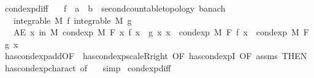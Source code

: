 \begin{isabellebody}
%
\endisatagproof
{\isafoldproof}%
%
\isadelimproof
\isanewline
%
\endisadelimproof
\isanewline
{}\isamarkupfalse%
\ cond{\isacharunderscore}{\kern0pt}exp{\isacharunderscore}{\kern0pt}diff{\isacharcolon}{\kern0pt}\isanewline
\ \ \ f\ {\isacharcolon}{\kern0pt}{\isacharcolon}{\kern0pt}\ {\isachardoublequoteopen}{\isacharprime}{\kern0pt}a\ {\isasymRightarrow}\ {\isacharprime}{\kern0pt}b\ {\isacharcolon}{\kern0pt}{\isacharcolon}{\kern0pt}\ {\isacharbraceleft}{\kern0pt}second{\isacharunderscore}{\kern0pt}countable{\isacharunderscore}{\kern0pt}topology{\isacharcomma}{\kern0pt}\ banach{\isacharbraceright}{\kern0pt}{\isachardoublequoteclose}\isanewline
\ \ \ {\isachardoublequoteopen}integrable\ M\ f{\isachardoublequoteclose}\ {\isachardoublequoteopen}integrable\ M\ g{\isachardoublequoteclose}\isanewline
\ \ \ {\isachardoublequoteopen}AE\ x\ in\ M{\isachardot}{\kern0pt}\ cond{\isacharunderscore}{\kern0pt}exp\ M\ F\ {\isacharparenleft}{\kern0pt}{\isasymlambda}x{\isachardot}{\kern0pt}\ f\ x\ {\isacharminus}{\kern0pt}\ g\ x{\isacharparenright}{\kern0pt}\ x\ {\isacharequal}{\kern0pt}\ cond{\isacharunderscore}{\kern0pt}exp\ M\ F\ f\ x\ {\isacharminus}{\kern0pt}\ cond{\isacharunderscore}{\kern0pt}exp\ M\ F\ g\ x{\isachardoublequoteclose}\isanewline
%
\isadelimproof
\ \ %
\endisadelimproof
%
\isatagproof
{}\isamarkupfalse%
\ has{\isacharunderscore}{\kern0pt}cond{\isacharunderscore}{\kern0pt}exp{\isacharunderscore}{\kern0pt}add{\isacharbrackleft}{\kern0pt}OF\ {\isacharunderscore}{\kern0pt}\ has{\isacharunderscore}{\kern0pt}cond{\isacharunderscore}{\kern0pt}exp{\isacharunderscore}{\kern0pt}scaleR{\isacharunderscore}{\kern0pt}right{\isacharcomma}{\kern0pt}\ OF\ has{\isacharunderscore}{\kern0pt}cond{\isacharunderscore}{\kern0pt}expI{\isacharparenleft}{\kern0pt}{}{\isacharcomma}{\kern0pt}{}{\isacharparenright}{\kern0pt}{\isacharcomma}{\kern0pt}\ OF\ assms{\isacharcomma}{\kern0pt}\ THEN\ has{\isacharunderscore}{\kern0pt}cond{\isacharunderscore}{\kern0pt}exp{\isacharunderscore}{\kern0pt}charact{\isacharparenleft}{\kern0pt}{}{\isacharparenright}{\kern0pt}{\isacharcomma}{\kern0pt}\ of\ {\isachardoublequoteopen}{\isacharminus}{\kern0pt}{}{\isachardoublequoteclose}{\isacharbrackright}{\kern0pt}\ \isamarkupfalse%
\ simp%
\endisatagproof
{\isafoldproof}%
%
\isadelimproof
\isanewline
%
\endisadelimproof
\isanewline
{}\isamarkupfalse%
\ cond{\isacharunderscore}{\kern0pt}exp{\isacharunderscore}{\kern0pt}diff{\isacharprime}{\kern0pt}{\isacharcolon}{\kern0pt}\isanewline

\end{isabellebody}
